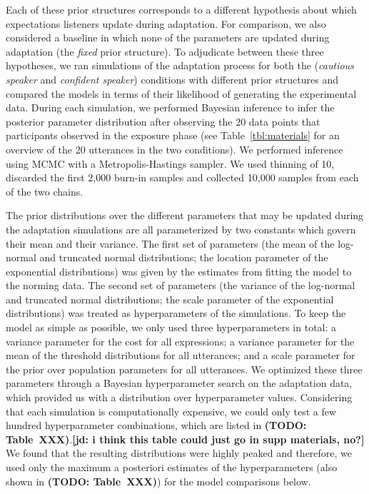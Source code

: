 \documentclass[man, floatsintext]{apa6}
\newcommand{\jd}[1]{\textcolor{PinkyPurple}{\textbf{[jd: #1]}}}
\newcommand{\todo}[1]{}
\renewcommand{\todo}[1]{{\bf \color{red} (TODO: {#1})}}
\begin{document}
Each of these prior structures corresponds to a different hypothesis about which expectations listeners update during adaptation. For comparison, we also considered a baseline in which none of the parameters are updated during adaptation (the {\it fixed} prior structure). To adjudicate between these three hypotheses, we ran simulations of the adaptation process for both the (\textit{cautious speaker} and \textit{confident speaker}) conditions with different prior structures and compared the models in terms of their likelihood of generating the experimental data. During each simulation, we performed Bayesian inference to infer the posterior parameter distribution after observing the 20 data points that participants observed in the exposure phase (see Table~\ref{tbl:materials} for an overview of the 20 utterances in the two conditions). We performed inference using MCMC with a Metropolis-Hastings sampler. We used thinning of 10, discarded the first 2,000 burn-in samples and collected 10,000 samples from each of the two chains.

The prior distributions over the different parameters that may be updated during the adaptation simulations are all parameterized by two constants which govern their mean and their variance. The first set of parameters (the mean of the log-normal and truncated normal distributions; the location parameter of the exponential distributions) was given by the estimates from fitting the model to the norming data. The second set of parameters (the variance of the log-normal and truncated normal distributions; the scale parameter of the exponential distributions) was treated as hyperparameters of the simulations. To keep the model as simple as possible, we only used three hyperparameters in total: a variance parameter for the cost for all expressions; a variance parameter for the mean of the threshold distributions for all utterances; and a scale parameter for the prior over population parameters for all utterances. We optimized these three parameters through a Bayesian hyperparameter search on the adaptation data, which provided us with a distribution over hyperparameter values. Considering that each simulation is computationally expensive, we could only test a few hundred hyperparameter combinations, which are listed in \todo{Table~XXX}.\jd{i think this table could just go in supp materials, no?} We found that the resulting distributions were highly peaked and therefore, we used only the maximum a posteriori estimates of the hyperparameters (also shown in \todo{Table~XXX}) for the model comparisons below.
\end{document}
